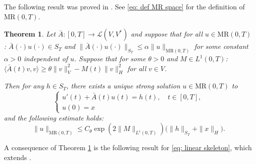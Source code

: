 \documentclass{amsart}
\renewcommand{\MR}{\mathrm{MR}}
\newcommand{\<}{\langle}
\newcommand{\?}{\rangle}
\theoremstyle{plain}
\newtheorem{theorem}{Theorem}[section]
\theoremstyle{remark}
\theoremstyle{plain}
\numberwithin{equation}{section}
\begin{document}
The following result was proved in \cite[Th.\ 3.4]{TV24}. See \eqref{eq: def MR space} for the definition of $\MR(0,T)$. 
 

\begin{theorem}\label{th: well-posed with M in L^1}
Let $\bar{A}\colon [0,T]\to\mathscr{L}(V,V^*)$ and suppose that
for all $u\in\MR(0,T)$: $  \bar{A}(\cdot)u(\cdot)\in S_T$ and $\|\bar{A}(\cdot)u(\cdot)\|_{S_T}\leq \alpha \|u\|_{\MR(0,T)}$ 
  for some constant $\alpha>0$ independent of $u$.
  Suppose that for some $\theta>0$ and $M\in L^1(0,T)$:  $\<\bar{A}(t)v,v\?\geq \theta \|v\|_V^2-M(t)\|v\|_H^2$ for all $v\in V$.  
  
  Then for any $h\in S_T$, there exists a unique strong solution  $u\in \MR(0,T)$ to
  \begin{equation*}
    \begin{cases}
    u'(t)+\bar{A}(t)u(t)=h(t), \quad t\in[0,T],\\
    u(0)=x
  \end{cases}
  \end{equation*}
 and the following estimate holds:
 \begin{equation*}
\|u\|_{\MR(0,T)}\leq C_{\theta}\exp(2\|M\|_{L^1(0,T)})\big(\|h\|_{S_T}+\|x\|_H\big).
\end{equation*}
\end{theorem}

A consequence of Theorem \ref{th: well-posed with M in L^1} is the following result for \eqref{eq: linear skeleton},  which extends  \cite[Cor.\ 3.5]{TV24}. 
\end{document}
